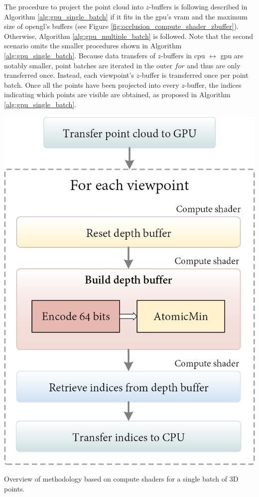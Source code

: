 The procedure to project the point cloud into $z$-buffers is following described in Algorithm \ref{alg:gpu_single_batch} if it fits in the \acrshort{gpu}'s \acrshort{vram} and the maximum size of \acrshort{opengl}'s buffers (see Figure \ref{fig:occlusion_compute_shader_zbuffer}). Otherwise, Algorithm \ref{alg:gpu_multiple_batch} is followed. Note that the second scenario omits the smaller procedures shown in Algorithm \ref{alg:gpu_single_batch}. Because data transfers of $z$-buffers in \acrshort{cpu} $\leftrightarrow$ \acrshort{gpu} are notably smaller, point batches are iterated in the outer $\textit{for}$ and thus are only transferred once. Instead, each viewpoint's $z$-buffer is transferred once per point batch. Once all the points have been projected into every $z$-buffer, the indices indicating which points are visible are obtained, as proposed in Algorithm \ref{alg:gpu_single_batch}.
\begin{marginfigure}[.3cm]
    \includegraphics[width=\linewidth]{figs/multi_thermal_projection/occlusion_compute_shader.png}
    \caption{Overview of methodology based on compute shaders for a single batch of 3D points.}
    \label{fig:occlusion_compute_shader_zbuffer}
\end{marginfigure}

